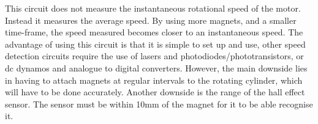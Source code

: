 \documentclass[a4]{report}
\begin{document}
	This circuit does not measure the instantaneous rotational speed of the motor. Instead it measures the average speed. By using more magnets, and a smaller time-frame, the speed measured becomes closer to an instantaneous speed. The advantage of using this circuit is that it is simple to set up and use, other speed detection circuits require the use of lasers and photodiodes/phototransistors, or dc dynamos and analogue to digital converters. However, the main downside lies in having to attach magnets at regular intervals to the rotating cylinder, which will have to be done accurately. Another downside is the range of the hall effect sensor. The sensor must be within 10mm of the magnet for it to be able recognise it. \newline \newline \noindent

\end{document}
